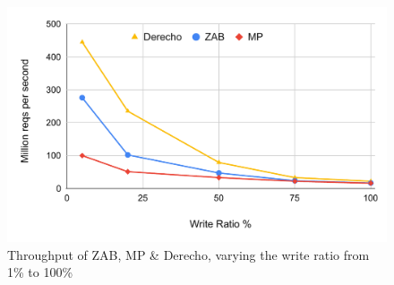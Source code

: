 \begin{figure}[t]
  \centering
  \includegraphics[scale=0.4]{1_figures/zab-mp-dr.pdf}
  \caption{Throughput of ZAB, MP \& Derecho, varying the write ratio from 1\% to 100\%}
  \label{fig:zab-mp-dr}
\end{figure}